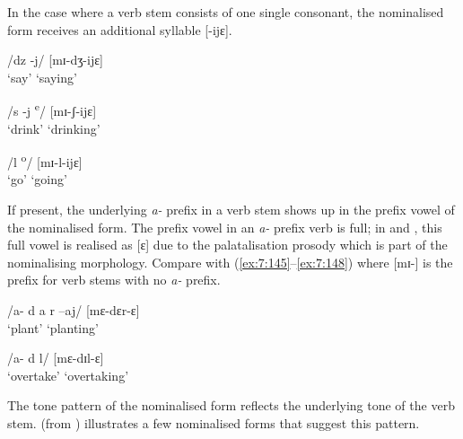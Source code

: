 In the case where a verb stem consists of one single consonant, the nominalised form receives an additional syllable [{}-ijɛ].

\ea\label{ex:7:149}
/dz -j/  \hspace{55pt}  [mɪ-dʒ-ijɛ]\\
\glt ‘say’  \hspace{60pt}  ‘saying’
\z

\ea\label{ex:7:150}
 /s -j \textsuperscript{e}/  \hspace{55pt}  [mɪ-ʃ{}-ijɛ]\\
\glt  ‘drink’  \hspace{53pt}   ‘drinking’
\z 

\ea\label{ex:7:151}
  \textup{/l \textsuperscript{o}/ \hspace{65pt}   [mɪ-l-ijɛ}]\\
\glt  ‘go’   \hspace{65pt}   ‘going’
\z 

If present, the underlying \textit{a-} prefix in a verb stem shows up in the prefix vowel of the nominalised form. The prefix vowel in an \textit{a-} prefix verb is full; in  and , this full vowel is realised as [ɛ] due to the palatalisation prosody which is part of the nominalising morphology. Compare with (\ref{ex:7:145}--\ref{ex:7:148}) where [mɪ-] is the prefix for verb stems with no \textit{a-} prefix. 

\ea\label{ex:7:152}
  \textup{/a- d a r –aj/  \hspace{27pt}  [mɛ-dɛr-ɛ}]\\
\glt  ‘plant’ \hspace{55pt}   ‘planting’
\z

\ea\label{ex:7:153}
  \textup{/a- d l/ \hspace{52pt}   [mɛ-dɪl-ɛ}]\\
\glt  ‘overtake’ \hspace{40pt}  ‘overtaking’
\z 

The tone pattern of the nominalised form reflects the underlying tone of the verb stem.   (from \citealt{FriesenMamalis2008}) illustrates a few nominalised forms that suggest this pattern.

